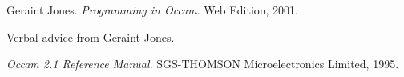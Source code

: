 

\begin{thebibliography}{99}

  Geraint Jones.
  \textit{Programming in Occam}.
  Web Edition, 2001.

  Verbal advice from Geraint Jones.

  \textit{Occam 2.1 Reference Manual}.
  SGS-THOMSON Microelectronics Limited, 1995.

\end{thebibliography}
